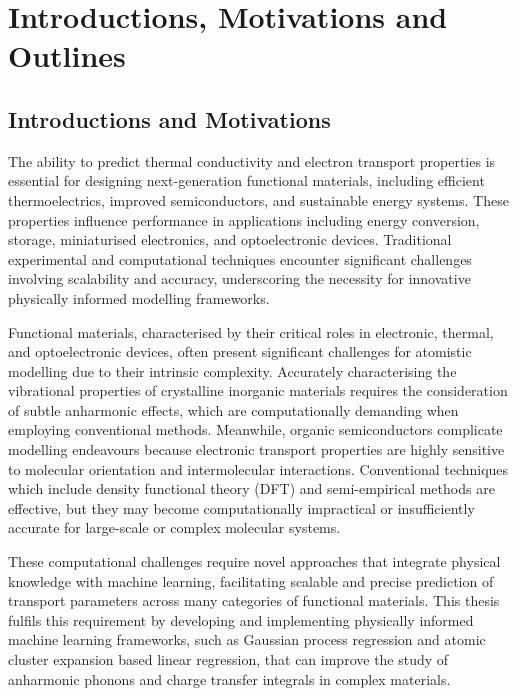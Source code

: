 \chapter{Introductions, Motivations and Outlines}
\label{ch:1}


\section{Introductions and Motivations}
\label{sec:1.1}

The ability to predict thermal conductivity and electron transport properties is essential for designing next-generation functional materials, including efficient thermoelectrics, improved semiconductors, and sustainable energy systems. These properties influence performance in applications including energy conversion, storage, miniaturised electronics, and optoelectronic devices. Traditional experimental and computational techniques encounter significant challenges involving scalability and accuracy, underscoring the necessity for innovative physically informed modelling frameworks.

Functional materials, characterised by their critical roles in electronic, thermal, and optoelectronic devices, often present significant challenges for atomistic modelling due to their intrinsic complexity. Accurately characterising the vibrational properties of crystalline inorganic materials requires the consideration of subtle anharmonic effects, which are computationally demanding when employing conventional methods. Meanwhile, organic semiconductors complicate modelling endeavours because electronic transport properties are highly sensitive to molecular orientation and intermolecular interactions. Conventional techniques which include density functional theory (DFT) and semi-empirical methods are effective, but they may become computationally impractical or insufficiently accurate for large-scale or complex molecular systems.

These computational challenges require novel approaches that integrate physical knowledge with machine learning, facilitating scalable and precise prediction of transport parameters across many categories of functional materials. This thesis fulfils this requirement by developing and implementing physically informed machine learning frameworks, such as Gaussian process regression and atomic cluster expansion based linear regression, that can improve the study of anharmonic phonons and charge transfer integrals in complex materials.

